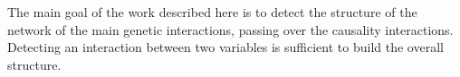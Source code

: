 The main goal of the work described here is to detect the structure of the network of the main genetic interactions, passing over the causality interactions. Detecting an interaction between two variables is sufficient to build the overall structure. 


%
%
%
